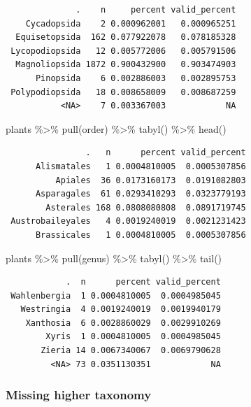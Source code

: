 \documentclass[
  letterpaper,
  DIV=11,
  numbers=noendperiod,
  oneside]{scrreprt}
\newenvironment{Shaded}{\begin{snugshade}}{\end{snugshade}}
\newcommand{\FunctionTok}[1]{\textcolor[rgb]{0.28,0.35,0.67}{#1}}
\newcommand{\NormalTok}[1]{\textcolor[rgb]{0.00,0.23,0.31}{#1}}
\newcommand{\SpecialCharTok}[1]{\textcolor[rgb]{0.37,0.37,0.37}{#1}}
\begin{document}
\begin{verbatim}
              .    n     percent valid_percent
    Cycadopsida    2 0.000962001   0.000965251
  Equisetopsida  162 0.077922078   0.078185328
 Lycopodiopsida   12 0.005772006   0.005791506
  Magnoliopsida 1872 0.900432900   0.903474903
      Pinopsida    6 0.002886003   0.002895753
 Polypodiopsida   18 0.008658009   0.008687259
           <NA>    7 0.003367003            NA
\end{verbatim}

\begin{Shaded}
\begin{Highlighting}[]
\NormalTok{plants }\SpecialCharTok{\%\textgreater{}\%} 
  \FunctionTok{pull}\NormalTok{(order) }\SpecialCharTok{\%\textgreater{}\%} 
  \FunctionTok{tabyl}\NormalTok{() }\SpecialCharTok{\%\textgreater{}\%} 
  \FunctionTok{head}\NormalTok{()}
\end{Highlighting}
\end{Shaded}

\begin{verbatim}
                .   n      percent valid_percent
      Alismatales   1 0.0004810005  0.0005307856
          Apiales  36 0.0173160173  0.0191082803
      Asparagales  61 0.0293410293  0.0323779193
        Asterales 168 0.0808080808  0.0891719745
 Austrobaileyales   4 0.0019240019  0.0021231423
      Brassicales   1 0.0004810005  0.0005307856
\end{verbatim}

\begin{Shaded}
\begin{Highlighting}[]
\NormalTok{plants }\SpecialCharTok{\%\textgreater{}\%} 
  \FunctionTok{pull}\NormalTok{(genus) }\SpecialCharTok{\%\textgreater{}\%} 
  \FunctionTok{tabyl}\NormalTok{() }\SpecialCharTok{\%\textgreater{}\%} 
  \FunctionTok{tail}\NormalTok{()}
\end{Highlighting}
\end{Shaded}

\begin{verbatim}
            .  n      percent valid_percent
 Wahlenbergia  1 0.0004810005  0.0004985045
   Westringia  4 0.0019240019  0.0019940179
    Xanthosia  6 0.0028860029  0.0029910269
        Xyris  1 0.0004810005  0.0004985045
       Zieria 14 0.0067340067  0.0069790628
         <NA> 73 0.0351130351            NA
\end{verbatim}

\hypertarget{missing-higher-taxonomy}{%
\subsubsection*{Missing higher taxonomy}\label{missing-higher-taxonomy}}
\end{document}
